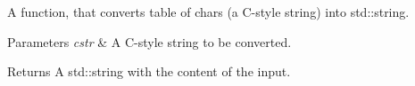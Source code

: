 A function, that converts table of chars (a C-\/style string) into std\-::string. 


\begin{DoxyParams}{Parameters}
{\em cstr} & A C-\/style string to be converted. \\
\hline
\end{DoxyParams}
\begin{DoxyReturn}{Returns}
A std\-::string with the content of the input. 
\end{DoxyReturn}
